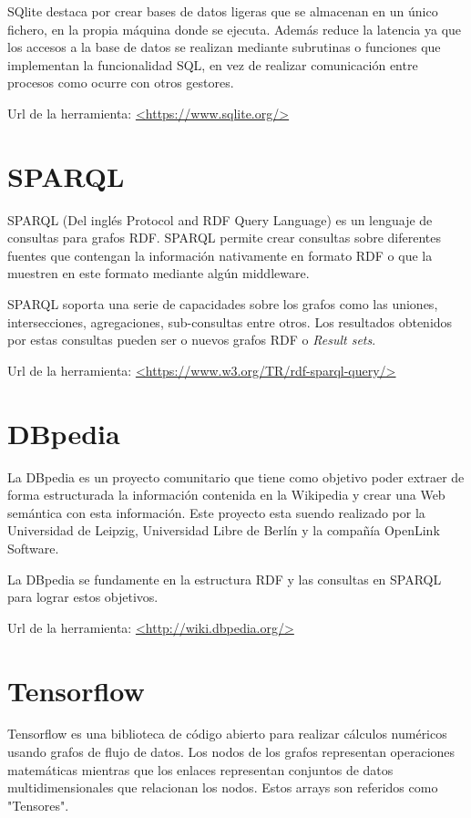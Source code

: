 SQlite destaca por crear bases de datos ligeras que se almacenan en un único fichero, en la propia máquina donde se ejecuta. Además reduce la latencia ya que los accesos a la base de datos se realizan mediante subrutinas o funciones que implementan la funcionalidad SQL, en vez de realizar comunicación entre procesos como ocurre con otros gestores.\cite{wiki:SQlite}

Url de la herramienta: \url{<https://www.sqlite.org/>}

\section{SPARQL}

SPARQL (Del inglés Protocol and RDF Query Language) es un lenguaje de consultas para grafos RDF. SPARQL permite crear consultas sobre diferentes fuentes que contengan la información nativamente en formato RDF o que la muestren en este formato mediante algún middleware.\cite{SPARQL}

SPARQL soporta una serie de capacidades sobre los grafos como las uniones, intersecciones, agregaciones, sub-consultas entre otros. Los resultados obtenidos por estas consultas pueden ser o nuevos grafos RDF o \textit{Result sets}.

Url de la herramienta: \url{<https://www.w3.org/TR/rdf-sparql-query/>}


\section{DBpedia}

La DBpedia es un proyecto comunitario que tiene como objetivo poder extraer de forma estructurada la información contenida en la Wikipedia y crear una Web semántica con esta información. Este proyecto esta suendo realizado por la Universidad de Leipzig, Universidad Libre de Berlín y la compañía OpenLink Software. \cite{wiki:DBpedia}

La DBpedia se fundamente en la estructura RDF y las consultas en SPARQL para lograr estos objetivos.

Url de la herramienta: \url{<http://wiki.dbpedia.org/>}

\section{Tensorflow}

Tensorflow es una biblioteca de código abierto para realizar cálculos numéricos usando grafos de flujo de datos. Los nodos de los grafos representan operaciones matemáticas mientras que los enlaces representan conjuntos de datos multidimensionales que relacionan los nodos. Estos arrays son referidos como "Tensores".\cite{wiki:Tensorflow}


